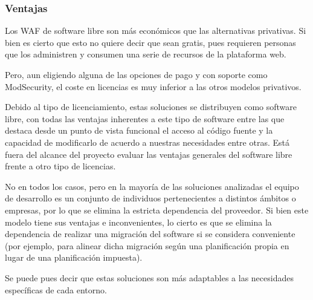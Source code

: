 \subsubsection{Ventajas}
\par Los WAF de software libre son más económicos que las alternativas privativas. Si bien es cierto que esto no quiere decir que sean gratis,
pues requieren personas que los administren y consumen una serie de recursos de la plataforma web.
\par Pero, aun eligiendo alguna de las opciones de pago y con soporte como ModSecurity, el coste en licencias es muy inferior a las otros modelos privativos.
\par Debido al tipo de licenciamiento, estas soluciones se distribuyen como software libre, con todas las ventajas inherentes a este
tipo de software entre las que destaca desde un punto de vista funcional el acceso al código fuente y la capacidad de modificarlo de acuerdo a
nuestras necesidades entre otras. Está fuera del alcance del proyecto evaluar las ventajas generales del software libre frente a otro tipo de
licencias.
\par No en todos los casos, pero en la mayoría de las soluciones analizadas el equipo de desarrollo es un conjunto de individuos pertenecientes
a distintos ámbitos o empresas, por lo que se elimina la estricta dependencia del proveedor. Si bien este modelo tiene sus ventajas e
inconvenientes, lo cierto es que se elimina la dependencia de realizar una migración del software si se considera conveniente (por ejemplo,
para alinear dicha migración según una planificación propia en lugar de una planificación impuesta).
\par Se puede pues decir que estas soluciones son más adaptables a las necesidades específicas de cada entorno.

